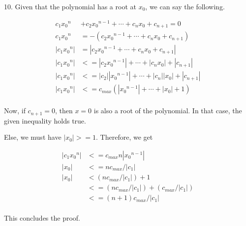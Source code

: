 \documentclass{article}
\begin{document}
10. Given that the polynomial has a root at $x_0$, we can say the following.

\begin{align*}
    c_1 {x_0}^n &+ c_2 {x_0}^{n - 1} + \cdots + c_n x_0 + c_{n + 1} = 0 \\
    c_1 {x_0}^n &= -(c_2 {x_0}^{n - 1} + \cdots + c_n x_0 + c_{n + 1}) \\
    |c_1 {x_0}^n| &= |c_2 {x_0}^{n - 1} + \cdots + c_n x_0 + c_{n + 1}| \\
    |c_1 {x_0}^n| &<= |c_2 {x_0}^{n - 1}| + \cdots + |c_n x_0| + |c_{n + 1}| \\
    |c_1 {x_0}^n| &<= |c_2| |{x_0}^{n - 1}| + \cdots + |c_n| |x_0| + |c_{n + 1}| \\
    |c_1 {x_0}^n| &<= c_{max} (|{x_0}^{n - 1}| + \cdots + |x_0| + 1) \\
\end{align*}

Now, if $c_{n + 1} = 0$, then $x = 0$ is also a root of the polynomial. In that case, the given inequality holds true.

Else, we must have $|x_0| >= 1$. Therefore, we get

\begin{align*}
    |c_1 {x_0}^n| &<= c_{max} n |{x_0}^{n - 1}| \\
    |x_0| &<= n c_{max} / |c_1| \\
    |x_0| &< (n c_{max} / |c_1|) + 1 \\
          &<= (n c_{max} / |c_1|) + (c_{max}/|c_1|) \\
          &<= (n + 1) c_{max} / |c_1| \\
\end{align*}

This concludes the proof.
\end{document}
